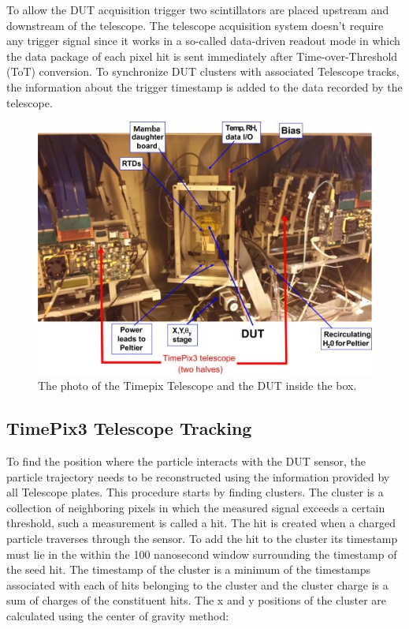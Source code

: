 To allow the DUT acquisition trigger two scintillators are placed upstream and downstream of the telescope. The telescope acquisition system doesn't require any trigger signal since it works in a so-called data-driven readout mode in which the data package of each pixel hit is sent immediately after Time-over-Threshold (ToT) conversion. To synchronize DUT clusters with associated Telescope tracks, the information about the trigger timestamp is added to the data recorded by the telescope.  


\begin{figure}[!h]
\centering
\hspace*{-1cm}\includegraphics{figures/telescope_photo.jpg}
\caption{The photo of the Timepix Telescope and the DUT inside the box. }
\label{fig:telescope_photo}
\end{figure}

\subsection{TimePix3 Telescope Tracking}

To find the position where the particle interacts with the DUT sensor, the particle trajectory needs to be reconstructed using the information provided by all Telescope plates. This procedure starts by finding clusters. The cluster is a collection of neighboring pixels in which the measured signal exceeds a certain threshold, such a measurement is called a hit. The hit is created when a charged particle traverses through the sensor.  To add the hit to the cluster its timestamp must lie in the within the 100 nanosecond window surrounding the timestamp of the seed hit. The timestamp of the cluster is a minimum of the timestamps associated with each of hits belonging to the cluster and the cluster charge is a sum of charges of the constituent hits. 
The x and y positions of the cluster are calculated using the center of gravity method: 

